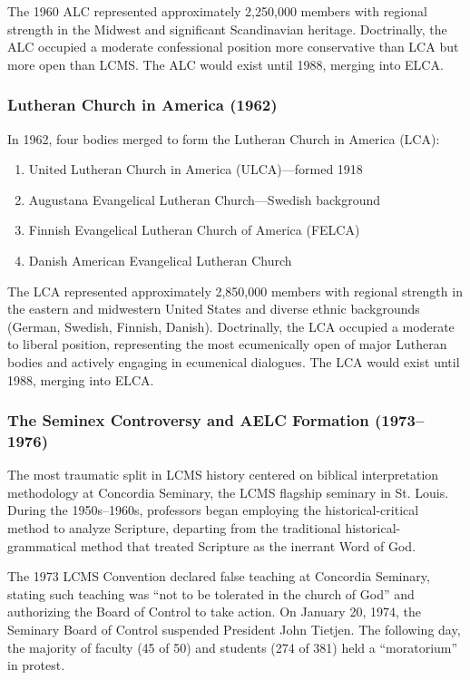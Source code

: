The 1960 ALC represented approximately 2,250,000 members with regional strength in the Midwest and significant Scandinavian heritage. Doctrinally, the ALC occupied a moderate confessional position more conservative than LCA but more open than LCMS. The ALC would exist until 1988, merging into ELCA.

\subsubsection{Lutheran Church in America (1962)}

In 1962, four bodies merged to form the Lutheran Church in America (LCA):

\begin{enumerate}
\item United Lutheran Church in America (ULCA)---formed 1918
\item Augustana Evangelical Lutheran Church---Swedish background
\item Finnish Evangelical Lutheran Church of America (FELCA)
\item Danish American Evangelical Lutheran Church
\end{enumerate}

The LCA represented approximately 2,850,000 members with regional strength in the eastern and midwestern United States and diverse ethnic backgrounds (German, Swedish, Finnish, Danish). Doctrinally, the LCA occupied a moderate to liberal position, representing the most ecumenically open of major Lutheran bodies and actively engaging in ecumenical dialogues. The LCA would exist until 1988, merging into ELCA.

\subsubsection{The Seminex Controversy and AELC Formation (1973--1976)}

The most traumatic split in LCMS history centered on biblical interpretation methodology at Concordia Seminary, the LCMS flagship seminary in St. Louis. During the 1950s--1960s, professors began employing the historical-critical method to analyze Scripture, departing from the traditional historical-grammatical method that treated Scripture as the inerrant Word of God.

The 1973 LCMS Convention declared false teaching at Concordia Seminary, stating such teaching was ``not to be tolerated in the church of God'' and authorizing the Board of Control to take action. On January 20, 1974, the Seminary Board of Control suspended President John Tietjen. The following day, the majority of faculty (45 of 50) and students (274 of 381) held a ``moratorium'' in protest.

